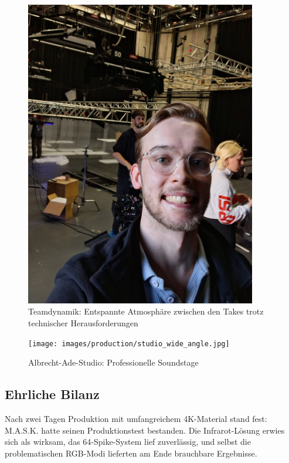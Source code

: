 \begin{figure}[h]
   \centering
   \includegraphics[width=0.9\textwidth]{images/onSetImages/MartySmileyIntoCameraOnSet.jpg}
   \caption{Teamdynamik: Entspannte Atmosphäre zwischen den Takes trotz technischer Herausforderungen}
   \label{fig:team_atmosphere}
\end{figure}

\begin{figure}[h]
   \centering
   \texttt{[image: images/production/studio\_wide\_angle.jpg]}
   \caption{Albrecht-Ade-Studio: Professionelle Soundstage}
   \label{fig:studio_wide}
\end{figure}

\newpage

\subsection{Ehrliche Bilanz}

Nach zwei Tagen Produktion mit umfangreichem 4K-Material stand fest: M.A.S.K. hatte seinen Produktionstest bestanden. Die Infrarot-Lösung erwies sich als wirksam, das 64-Spike-System lief zuverlässig, und selbst die problematischen RGB-Modi lieferten am Ende brauchbare Ergebnisse.

